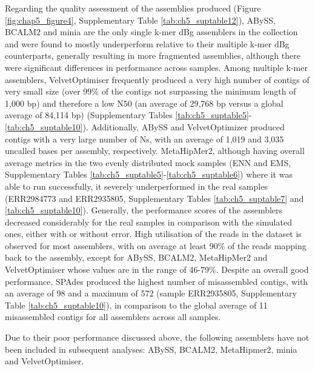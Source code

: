 Regarding the quality assessment of the assemblies produced (Figure \ref{fig:chap5_figure4}, Supplementary Table \ref{tab:ch5_suptable12}), ABySS, BCALM2 and minia are the only single k-mer \ac{dBg} assemblers in the collection and were found to mostly underperform relative to their multiple k-mer \ac{dBg} counterparts, generally resulting in more fragmented assemblies, although there were significant differences in performance across samples. Among multiple k-mer assemblers, VelvetOptimiser frequently produced a very high number of contigs of very small size (over 99\% of the contigs not surpassing the minimum length of 1,000 \ac{bp}) and therefore a low N50 (an average of 29,768 \ac{bp} versus a global average of 84,114 \ac{bp}) (Supplementary Tables \ref{tab:ch5_suptable5}-\ref{tab:ch5_suptable10}). Additionally, ABySS and VelvetOptimizer produced contigs with a very large number of Ns, with an average of 1,019 and 3,035 uncalled bases per assembly, respectively. MetaHipMer2, although having overall average metrics in the two evenly distributed mock samples (ENN and EMS, Supplementary Tables \ref{tab:ch5_suptable5}-\ref{tab:ch5_suptable6}) where it was able to run successfully, it severely underperformed in the real samples (ERR2984773 and ERR2935805, Supplementary Tables \ref{tab:ch5_suptable7} and \ref{tab:ch5_suptable10}). Generally, the performance scores of the assemblers decreased considerably for the real samples in comparison with the simulated ones, either with or without error. High utilisation of the reads in the dataset is observed for most assemblers, with on average at least 90\% of the reads mapping back to the assembly, except for ABySS, BCALM2, MetaHipMer2 and VelvetOptimiser whose values are in the range of 46-79\%. Despite an overall good performance, SPAdes produced the highest number of misassembled contigs, with an average of 98 and a maximum of 572 (sample ERR2935805, Supplementary Table \ref{tab:ch5_suptable10}), in comparison to the global average of 11 misassembled contigs for all assemblers across all samples.

Due to their poor performance discussed above, the following assemblers have not been included in subsequent analyses: ABySS, BCALM2, MetaHipmer2, minia and VelvetOptimiser. 

